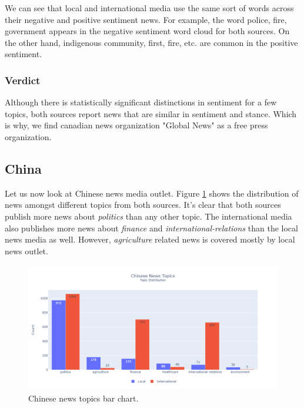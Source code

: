 \documentclass{article}
\theoremstyle{mytheoremstyle}
\theoremstyle{mytheoremstyle}
\theoremstyle{myproblemstyle}
\begin{document}
    We can see that local and international media use the same sort of words across their negative and positive sentiment news. For example, the word police, fire, government appears in the negative sentiment word cloud for both sources. On the other hand, indigenous community, first, fire, etc. are common in the positive sentiment.

    \subsubsection{Verdict}

    Although there is statistically significant distinctions in sentiment for a few topics, both sources report news that are similar in sentiment and stance. Which is why, we find canadian news organization "Global News" as a free press organization.
    
    \subsection{China}

    Let us now look at Chinese news media outlet. Figure \ref{fig:china_topic} shows the distribution of news amongst different topics from both sources. It's clear that both sources publish more news about \emph{politics} than any other topic. The international media also publishes more news about \emph{finance} and \emph{international-relations} than the local news media as well. However, \emph{agriculture} related news is covered mostly by local news outlet.
    
    \begin{figure}[hp]
        \centering
        \includegraphics[width=\linewidth]{../images/plots/China/china_barchart_topics.png}
        \caption{Chinese news topics bar chart.}
        \label{fig:china_topic}
    \end{figure}
\end{document}
